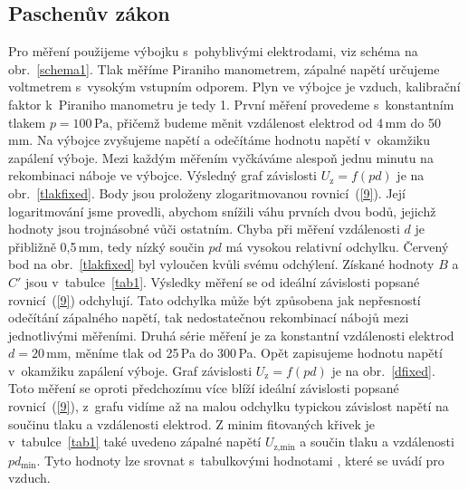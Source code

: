 \documentclass[a4paper,12pt]{article}
\begin{document}
\subsection{Paschenův zákon}
Pro měření použijeme výbojku s~pohyblivými elektrodami, viz schéma na 
obr.~\ref{schema1}. Tlak měříme Piraniho 
manometrem, zápalné napětí určujeme voltmetrem s~vysokým vstupním odporem. Plyn 
ve výbojce je vzduch, kalibrační faktor k~Piraniho manometru je tedy 1. První 
měření provedeme s~konstantním tlakem $p = 100\,\si{\pascal}$, přičemž budeme 
měnit vzdálenost elektrod od 4\,\si{\milli\meter} do 50\,\si{\milli\meter}. Na 
výbojce zvyšujeme napětí a odečítáme hodnotu napětí v~okamžiku zapálení výboje. 
Mezi každým měřením vyčkáváme alespoň jednu minutu na rekombinaci náboje ve 
výbojce. Výsledný graf závislosti $U_\text{z} = f(pd)$ je na 
obr.~\ref{tlakfixed}. 
Body jsou proloženy zlogaritmovanou rovnicí~(\ref{9}). Její logaritmování jsme 
provedli, abychom snížili váhu prvních dvou bodů, jejichž hodnoty jsou 
trojnásobné vůči ostatním. Chyba při měření vzdálenosti $d$ je 
přibližně 0,5\,mm, tedy nízký součin $pd$ má vysokou relativní odchylku. 
Červený bod na 
obr.~\ref{tlakfixed} byl 
vyloučen kvůli svému odchýlení. Získané hodnoty $B$ 
a $C'$ jsou v~tabulce~\ref{tab1}. Výsledky měření se od ideální závislosti 
popsané 
rovnicí~(\ref{9}) odchylují. Tato odchylka může být způsobena jak 
nepřesností odečítání zápalného napětí, tak nedostatečnou rekombinací nábojů 
mezi jednotlivými měřeními. 
Druhá série měření je za konstantní vzdálenosti elektrod $d = 
20\,\si{\milli\meter}$, 
měníme tlak od 25\,\si{\pascal} do 300\,\si{\pascal}. Opět zapisujeme hodnotu 
napětí v~okamžiku zapálení výboje. Graf závislosti $U_\text{z} = f(pd)$ je na 
obr.~\ref{dfixed}. Toto měření se oproti 
předchozímu více 
blíží ideální závislosti popsané rovnicí~(\ref{9}), z~grafu vidíme až na malou 
odchylku typickou závislost napětí na součinu tlaku a vzdálenosti elektrod.
Z minim fitovaných křivek je v~tabulce~\ref{tab1} také uvedeno zápalné napětí 
$U_\text{z,min}$ a 
součin tlaku a vzdálenosti $pd_{\text{min}}$. Tyto hodnoty 
lze srovnat s~tabulkovými hodnotami \cite{wiki,gamma}, které se uvádí pro 
vzduch.
\end{document}
